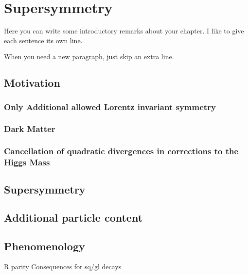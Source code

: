 

\chapter[Supersymmetry][Top of Page Title]{Supersymmetry}\label{ch:susy}

Here you can write some introductory remarks about your chapter.
I like to give each sentence its own line.

When you need a new paragraph, just skip an extra line.

\section{Motivation}

\subsection{Only Additional allowed Lorentz invariant symmetry}
\subsection{Dark Matter}
\subsection{Cancellation of quadratic divergences in corrections to the Higgs Mass}

\section{Supersymmetry}

\section{Additional particle content}

\section{Phenomenology}

R parity
Consequences for sq/gl decays
